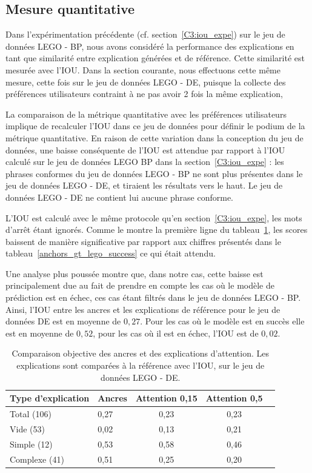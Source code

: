 \subsection{Mesure quantitative}\label{C3:iou_lego_de}

Dans l'expérimentation précédente (cf. section~\ref{C3:iou_expe}) sur le jeu de données LEGO - BP, nous avons considéré la performance des explications en tant que similarité entre explication générées et de référence. Cette similarité est mesurée avec l'IOU. Dans la section courante, nous effectuons cette même mesure, cette fois sur le jeu de données LEGO - DE, puisque la collecte des préférences utilisateurs contraint à ne pas avoir 2 fois la même explication,

La comparaison de la métrique quantitative avec les préférences utilisateurs implique de recalculer l'IOU dans ce jeu de données pour définir le podium de la métrique quantitative.
En raison de cette variation dans la conception du jeu de données, une baisse conséquente de l'IOU est attendue par rapport à l'IOU calculé sur le jeu de données LEGO BP dans la section~\ref{C3:iou_expe} : les phrases conformes du jeu de données LEGO - BP ne sont plus présentes dans le jeu de données LEGO - DE, et tiraient les résultats vers le haut. Le jeu de données LEGO - DE ne contient lui aucune phrase conforme.

L'IOU est calculé avec le même protocole qu'en section~\ref{C3:iou_expe}, les mots d'arrêt étant ignorés. Comme le montre la première ligne du tableau~\ref{iou_lego_de_cplx}, les scores baissent de manière significative par rapport aux chiffres présentés dans le tableau~\ref{anchors_gt_lego_success} ce qui était attendu.

Une analyse plus poussée montre que, dans notre cas, cette baisse est principalement due au fait de prendre en compte les cas où le modèle de prédiction est en échec, ces cas étant filtrés dans le jeu de données LEGO - BP. Ainsi, l'IOU entre les ancres et les explications de référence pour le jeu de données DE est en moyenne de $0,27$. Pour les cas où le modèle est en succès elle est en moyenne de $0,52$, pour les cas où il est en échec, l'IOU est de $0,02$.

\begin{table}[h!tpb]
  \centering
  \addtolength{\parskip}{-0.5mm}
\caption{Comparaison objective des ancres et des explications d'attention. Les explications sont comparées à la référence avec l'IOU, sur le jeu de données LEGO - DE.}\label{iou_lego_de_cplx}
\begin{tabular}{|l|l|c|c|c|}
  \hline
  \textbf{Type d'explication} & \textbf{Ancres} & \textbf{Attention 0,15} & \textbf{Attention 0,5} \\ \hline
  Total  (106)  & 0,27 & 0,23 & 0,23 \\ \hline \hline
  Vide (53) & 0,02 & 0,13 & 0,21 \\ \hline
  Simple (12) & 0,53 & 0,58 & 0,46 \\ \hline
  Complexe (41) & 0,51 & 0,25 & 0,20 \\ \hline
\end{tabular}
\end{table}

